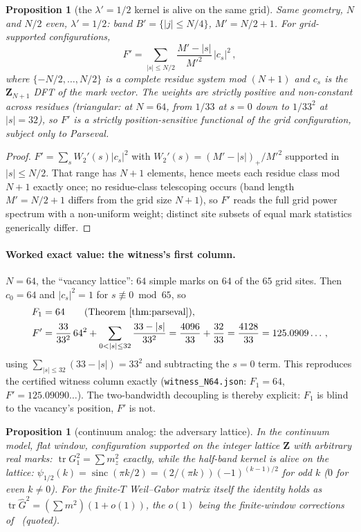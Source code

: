 \documentclass[11pt]{article}
\theoremstyle{plain}
\newtheorem{proposition}[theorem]{Proposition}
\theoremstyle{definition}
\theoremstyle{remark}
\newcommand{\Z}{\mathbf{Z}}
\newcommand{\Gh}{\widehat{G}}
\newcommand{\tr}{\operatorname{tr}}
\newcommand{\sinc}{\operatorname{sinc}}
\begin{document}
\begin{proposition}[the $\lambda' = 1/2$ kernel is alive on the same grid]
\label{prop:halfband}
Same geometry, $N$ and $N/2$ even, $\lambda' = 1/2$: band
$B' = \{|j| \le N/4\}$, $M' = N/2 + 1$. For grid-supported configurations,
\[
  F' = \sum_{|s| \le N/2} \frac{M' - |s|}{M'^2}\, |c_s|^2 \,,
\]
where $\{-N/2, \ldots, N/2\}$ is a complete residue system mod $(N+1)$ and $c_s$
is the $\Z_{N+1}$ DFT of the mark vector. The weights are strictly positive and
non-constant across residues (triangular: at $N = 64$, from $1/33$ at $s = 0$
down to $1/33^2$ at $|s| = 32$), so $F'$ is a strictly position-sensitive
functional of the grid configuration, subject only to Parseval.
\end{proposition}

\begin{proof}
$F' = \sum_s W_2'(s) |c_s|^2$ with $W_2'(s) = (M' - |s|)_+/M'^2$ supported in
$|s| \le N/2$. That range has $N + 1$ elements, hence meets each residue class
mod $N + 1$ exactly once; no residue-class telescoping occurs (band length
$M' = N/2 + 1$ differs from the grid size $N + 1$), so $F'$ reads the full grid
power spectrum with a non-uniform weight; distinct site subsets of equal mark
statistics generically differ.
\end{proof}

\paragraph{Worked exact value: the witness's first column.}
$N = 64$, the ``vacancy lattice'': $64$ simple marks on $64$ of the $65$ grid
sites. Then $c_0 = 64$ and $|c_s|^2 = 1$ for $s \not\equiv 0 \bmod 65$, so
\begin{align*}
  F_1 &= 64 \qquad (\text{Theorem~\ref{thm:parseval}}),\\
  F' &= \frac{33}{33^2}\, 64^2
    + \sum_{0 < |s| \le 32} \frac{33 - |s|}{33^2}
    = \frac{4096}{33} + \frac{32}{33}
    = \frac{4128}{33} = 125.0909\ldots \,,
\end{align*}
using $\sum_{|s| \le 32} (33 - |s|) = 33^2$ and subtracting the $s = 0$ term.
This reproduces the certified witness column exactly
(\texttt{witness\_N64.json}: $F_1 = 64$, $F' = 125.09090\ldots$). The
two-bandwidth decoupling is thereby explicit: $F_1$ is blind to the vacancy's
position, $F'$ is not.

\begin{proposition}[continuum analog: the adversary lattice]
\label{prop:lattice}
In the continuum model, flat window, configuration supported on the integer
lattice $\Z$ with arbitrary real marks: $\tr G_1^2 = \sum m_z^2$ exactly, while
the half-band kernel is alive on the lattice:
$\psi_{1/2}(k) = \sinc(\pi k/2) = (2/(\pi k))(-1)^{(k-1)/2}$ for odd $k$ ($0$ for
even $k \ne 0$). For the finite-$T$ Weil--Gabor matrix itself the identity holds
as $\tr \Gh^2 = (\sum m^2)(1 + o(1))$, the $o(1)$ being the finite-window
corrections of~\cite{AF26} (quoted).
\end{proposition}
\end{document}
